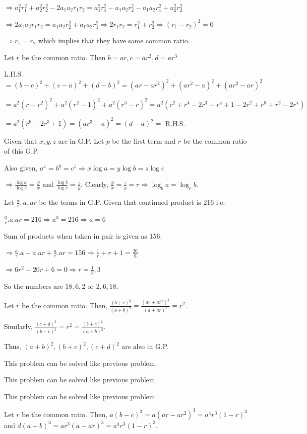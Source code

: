   $\Rightarrow a_1^2r_1^2 + a_2^2r_2^2 - 2a_1a_2r_1r_2 = a_1^2r_1^2 - a_1a_2r_2^2 - a_1a_2r_1^2 + a_2^2r_2^2$

  $\Rightarrow 2a_1a_2r_1r_2 = a_1a_2r_2^2 + a_1a_2r_1^2 \Rightarrow 2r_1r_2 = r_1^2 + r_2^2 \Rightarrow (r_1 - r_2)^2 = 0$

  $\Rightarrow r _1 = r_2$ which implies that they have same common ratio.
\item Let $r$ be the common ratio. Then $b = ar, c = ar^2, d = ar^3$

  L.H.S. $= (b - c)^2 + (c - a)^2 + (d - b)^2 = (ar - ar^2)^2 + (ar^2 - a)^2 + (ar^3 - ar)^2$

  $= a^2(r - r^2)^2 + a^2(r^2 - 1)^2 + a^2(r^3 - r)^2 = a^2(r^2 + r^4 - 2r^3 + r^4 + 1 - 2r^2 + r^6 + r^2 - 2r^4)$

  $= a^2(r^6 - 2r^3 + 1) = (ar^3 - a)^2 = (d - a)^2 = $ R.H.S.
\item Given that $x, y, z$ are in G.P. Let $p$ be the first term and $r$ be the common ratio of this G.P.

  Also given, $a^x = b^y = c^z \Rightarrow x\log a = y\log b = z\log c$

  $\Rightarrow \frac{\log a}{\log b} = \frac{y}{x}$ and $\frac{\log b}{\log c} = \frac{z}{y}$. Clearly, $\frac{y}{x} = \frac{z}{y} =
  r \Rightarrow \log_ba = \log_cb$.
\item Let $\frac{a}{r}, a, ar$ be the terms in G.P. Given that continued product is $216$ i.e.

  $\frac{a}{r}.a.ar = 216 \Rightarrow a^3 = 216 \Rightarrow a = 6$

  Sum of products when taken in pair is given as $156$.

  $\Rightarrow \frac{a}{r}.a + a.ar + \frac{a}{r}.ar = 156 \Rightarrow \frac{1}{r} + r + 1 = \frac{26}{6}$

  $\Rightarrow 6r^2 -20r + 6 = 0 \Rightarrow r = \frac{1}{3}, 3$

  So the numbers are $18, 6, 2$ or $2, 6, 18$.
\item Let $r$ be the common ratio. Then, $\frac{(b + c)^2}{(a + b)^2} = \frac{(ar + ar^2)^2}{(a + ar)^2} = r^2$.

  Similarly, $\frac{(c + d)^2}{(b + c)^2} = r^2 = \frac{(b + c)^2}{(a + b)^2}$.

  Thus, $(a + b)^2, (b + c)^2, (c + d)^2$ are also in G.P.
\item This problem can be solved like previous problem.
\item This problem can be solved like previous problem.
\item This problem can be solved like previous problem.
\item Let $r$ be the common ratio. Then, $a(b - c)^3 = a(ar - ar^2)^3 = a^4r^3(1 - r)^3$ and $d(a - b)^3 =
  ar^3(a - ar)^3 = a^4r^3(1 - r)^3$.

